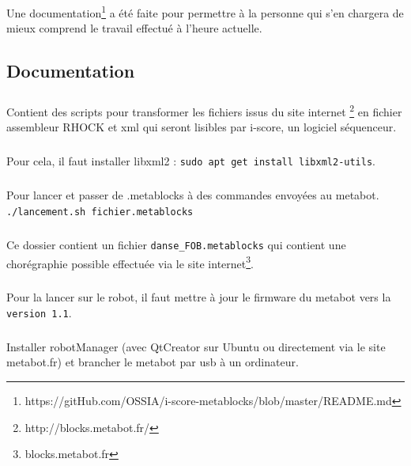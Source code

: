 \documentclass[10pt,a4paper]{report}
\begin{document}
Une documentation\footnote{https://gitHub.com/OSSIA/i-score-metablocks/blob/master/README.md} a été faite pour permettre à la personne qui s'en chargera de mieux comprend le travail effectué à l'heure actuelle.


\def\appendixpage{\vspace*{8cm} 
\begin{center} 
\Huge\textbf{Annexes} 
\end{center} 
} 
\def\appendixname{Annexe}%

\begin{appendices} 
\chapter{Documentation} 
\paragraph{}
Contient des scripts pour transformer les fichiers issus du site internet \footnote{http://blocks.metabot.fr/} en fichier assembleur RHOCK et xml qui seront lisibles par i-score, un logiciel séquenceur.
\paragraph{}
Pour cela, il faut installer libxml2 : 
\texttt{sudo apt get install libxml2-utils}.
\paragraph{}
Pour lancer et passer de .metablocks à des commandes envoyées au metabot.
\texttt{./lancement.sh fichier.metablocks}
\paragraph{}
Ce dossier contient un fichier \texttt{danse\_FOB.metablocks} qui contient une chorégraphie possible effectuée via le site internet\footnote{blocks.metabot.fr}.
\paragraph{}
Pour la lancer sur le robot, il faut mettre à jour le firmware du metabot vers la \texttt{version 1.1}.

\paragraph{}
Installer robotManager (avec QtCreator sur Ubuntu ou directement via le site metabot.fr) et brancher le metabot par usb à un ordinateur.

\end{appendices}
\end{document}
